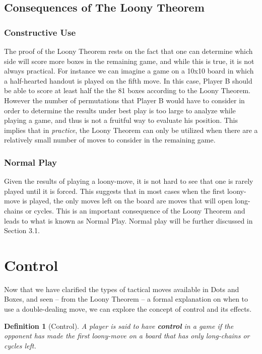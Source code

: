 \documentclass[12pt,twoside]{reedthesis}
\newtheorem{mydef}{Definition}
\begin{document}
\subsection{Consequences of The Loony Theorem}

\subsubsection{Constructive Use}
The proof of the Loony Theorem rests on the fact that one can determine which side will score more boxes in the remaining game, and while this is true, it is not always practical.  For instance we can imagine a game on a 10x10 board in which a half-hearted handout is played on the fifth move.  In this case, Player B should be able to score at least half the the 81 boxes according to the Loony Theorem.  However the number of permutations that Player B would have to consider in order to determine the results under best play is too large to analyze while playing a game, and thus is not a fruitful way to evaluate his position.  This implies that in \emph{practice}, the Loony Theorem can only be utilized when there are a relatively small number of moves to consider in the remaining game.

\subsubsection{Normal Play}
Given the results of playing a loony-move, it is not hard to see that one is rarely played until it is forced.  This suggests that in most cases when the first loony-move is played, the only moves left on the board are moves that will open long-chains or cycles.  This is an important consequence of the Loony Theorem and leads to what is known as Normal Play.  Normal play will be further discussed in Section 3.1.


\section{Control}
Now that we have clarified the types of tactical moves available in Dots and Boxes, and seen -- from the Loony Theorem -- a formal explanation on when to use a double-dealing move, we can explore the concept of control and its effects.

\begin{mydef}[Control]
A player is said to have \textbf{control} in a game if the opponent has made the first loony-move on a board that has only long-chains or cycles left.
\end{mydef}
\end{document}
